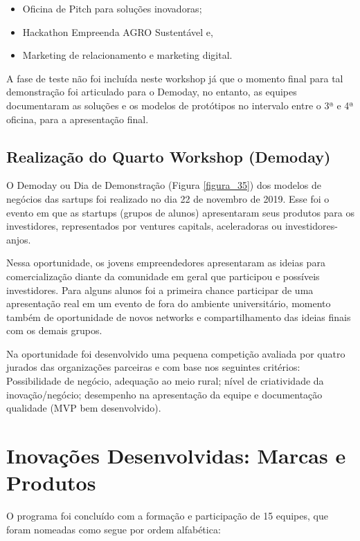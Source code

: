  \begin{itemize}
   \item Oficina de Pitch para soluções inovadoras;
   \item Hackathon Empreenda AGRO Sustentável e,
   \item Marketing de relacionamento e marketing digital.
 \end{itemize}

A fase de teste não foi incluída neste workshop já que o momento final para tal demonstração foi articulado para o Demoday, no entanto, as equipes documentaram as soluções e os modelos de protótipos no intervalo entre o 3ª e 4ª oficina, para a apresentação final.

\subsection{Realização do Quarto Workshop (Demoday)}


O Demoday ou Dia de Demonstração (Figura \ref{figura_35}) dos modelos de negócios das sartups foi realizado no dia 22 de novembro de 2019. Esse foi o evento em que as startups (grupos de alunos) apresentaram seus produtos para os investidores, representados por ventures capitals, aceleradoras ou investidores-anjos.

Nessa oportunidade, os jovens empreendedores apresentaram as ideias para comercialização diante da comunidade em geral que participou e possíveis investidores. Para alguns alunos foi a primeira chance participar de uma apresentação real em um evento de fora do ambiente universitário, momento também de oportunidade de novos networks e compartilhamento das ideias finais com os demais grupos.

Na oportunidade foi desenvolvido uma pequena competição avaliada por quatro jurados das organizações parceiras e com base nos seguintes critérios: Possibilidade de negócio, adequação ao meio rural; nível de criatividade da inovação/negócio; desempenho na apresentação da equipe e documentação qualidade (MVP bem desenvolvido). 

\section{Inovações Desenvolvidas: Marcas e Produtos}
\label{inovacoes}

O programa foi concluído  com a formação e participação de 15 equipes, que foram nomeadas como segue por ordem alfabética: 

